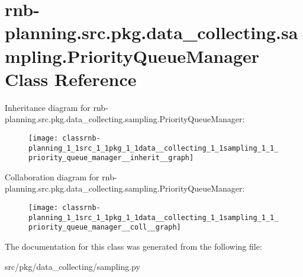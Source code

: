 \hypertarget{classrnb-planning_1_1src_1_1pkg_1_1data__collecting_1_1sampling_1_1_priority_queue_manager}{}\section{rnb-\/planning.src.\+pkg.\+data\+\_\+collecting.\+sampling.\+Priority\+Queue\+Manager Class Reference}
\label{classrnb-planning_1_1src_1_1pkg_1_1data__collecting_1_1sampling_1_1_priority_queue_manager}


Inheritance diagram for rnb-\/planning.src.\+pkg.\+data\+\_\+collecting.\+sampling.\+Priority\+Queue\+Manager\+:
\nopagebreak
\begin{figure}[H]
\begin{center}
\leavevmode
\texttt{[image: classrnb-planning\_1\_1src\_1\_1pkg\_1\_1data\_\_collecting\_1\_1sampling\_1\_1\_priority\_queue\_manager\_\_inherit\_\_graph]}
\end{center}
\end{figure}


Collaboration diagram for rnb-\/planning.src.\+pkg.\+data\+\_\+collecting.\+sampling.\+Priority\+Queue\+Manager\+:
\nopagebreak
\begin{figure}[H]
\begin{center}
\leavevmode
\texttt{[image: classrnb-planning\_1\_1src\_1\_1pkg\_1\_1data\_\_collecting\_1\_1sampling\_1\_1\_priority\_queue\_manager\_\_coll\_\_graph]}
\end{center}
\end{figure}


The documentation for this class was generated from the following file\+:\begin{DoxyCompactItemize}
\item 
src/pkg/data\+\_\+collecting/sampling.\+py\end{DoxyCompactItemize}
